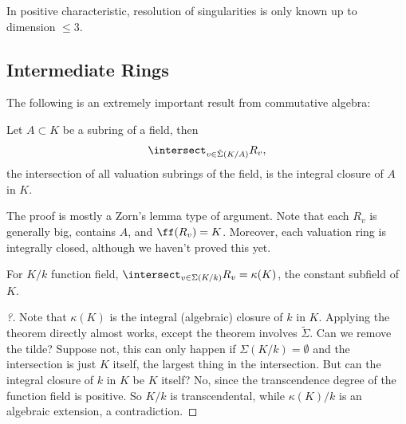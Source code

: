 \begin{problem}[Open]

In positive characteristic, resolution of singularities is only known up
to dimension \(\leq 3\).

\end{problem}

\hypertarget{intermediate-rings}{%
\subsection{Intermediate Rings}\label{intermediate-rings}}

The following is an extremely important result from commutative algebra:

\begin{theorem}[CA 17.17]

Let \(A \subset K\) be a subring of a field, then
\begin{align*}  
\intersect_{v\in \tilde \Sigma(K/A)} R_v
,\end{align*} the intersection of all valuation subrings of the field,
is the integral closure of \(A\) in \(K\).

\end{theorem}

The proof is mostly a Zorn's lemma type of argument. Note that each
\(R_v\) is generally big, contains \(A\), and \(\ff(R_v) = K\).
Moreover, each valuation ring is integrally closed, although we haven't
proved this yet.

\begin{corollary}[?]

For \(K/k\) function field,
\(\intersect_{v\in \Sigma(K/k)} R_v = \kappa(K)\), the constant subfield
of \(K\).

\end{corollary}

\begin{proof}[?]

Note that \(\kappa(K)\) is the integral (algebraic) closure of \(k\) in
\(K\). Applying the theorem directly almost works, except the theorem
involves \(\tilde \Sigma\). Can we remove the tilde? Suppose not, this
can only happen if \(\Sigma(K/k) = \emptyset\) and the intersection is
just \(K\) itself, the largest thing in the intersection. But can the
integral closure of \(k\) in \(K\) be \(K\) itself? No, since the
transcendence degree of the function field is positive. So \(K/k\) is
transcendental, while \(\kappa(K) / k\) is an algebraic extension, a
contradiction.

\end{proof}


